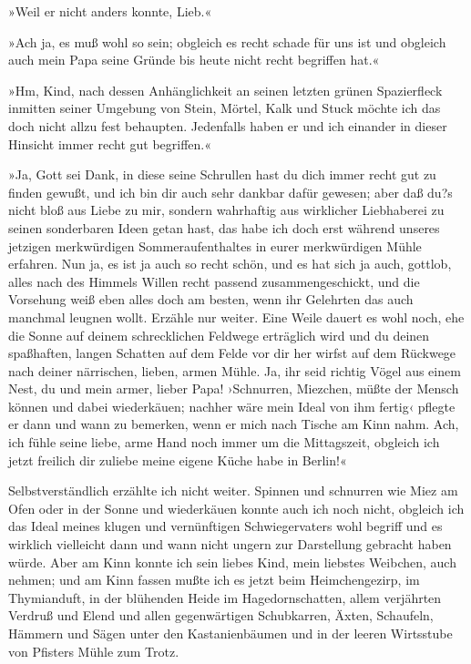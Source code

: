 »Weil er nicht anders konnte, Lieb.«

»Ach ja, es muß wohl so sein; obgleich es recht schade für uns ist
und obgleich auch mein Papa seine Gründe bis heute nicht recht
begriffen hat.«

»Hm, Kind, nach dessen Anhänglichkeit an seinen letzten grünen
Spazierfleck inmitten seiner Umgebung von Stein, Mörtel, Kalk und
Stuck möchte ich das doch nicht allzu fest behaupten. Jedenfalls
haben er und ich einander in dieser Hinsicht immer recht gut
begriffen.«

»Ja, Gott sei Dank, in diese seine Schrullen hast du dich immer
recht gut zu finden gewußt, und ich bin dir auch sehr dankbar dafür
gewesen; aber daß du?s nicht bloß aus Liebe zu mir, sondern
wahrhaftig aus wirklicher Liebhaberei zu seinen sonderbaren Ideen
getan hast, das habe ich doch erst während unseres jetzigen
merkwürdigen Sommeraufenthaltes in eurer merkwürdigen Mühle
erfahren. Nun ja, es ist ja auch so recht schön, und es hat sich ja
auch, gottlob, alles nach des Himmels Willen recht passend
zusammengeschickt, und die Vorsehung weiß eben alles doch am
besten, wenn ihr Gelehrten das auch manchmal leugnen wollt. Erzähle
nur weiter. Eine Weile dauert es wohl noch, ehe die Sonne auf
deinem schrecklichen Feldwege erträglich wird und du deinen
spaßhaften, langen Schatten auf dem Felde vor dir her wirfst auf
dem Rückwege nach deiner närrischen, lieben, armen Mühle. Ja, ihr
seid richtig Vögel aus einem Nest, du und mein armer, lieber Papa!
›Schnurren, Miezchen, müßte der Mensch können und dabei
wiederkäuen; nachher wäre mein Ideal von ihm fertig‹ pflegte er
dann und wann zu bemerken, wenn er mich nach Tische am Kinn nahm.
Ach, ich fühle seine liebe, arme Hand noch immer um die
Mittagszeit, obgleich ich jetzt freilich dir zuliebe meine eigene
Küche habe in Berlin!«

Selbstverständlich erzählte ich nicht weiter. Spinnen und schnurren
wie Miez am Ofen oder in der Sonne und wiederkäuen konnte auch ich
noch nicht, obgleich ich das Ideal meines klugen und vernünftigen
Schwiegervaters wohl begriff und es wirklich vielleicht dann und
wann nicht ungern zur Darstellung gebracht haben würde. Aber am
Kinn konnte ich sein liebes Kind, mein liebstes Weibchen, auch
nehmen; und am Kinn fassen mußte ich es jetzt beim Heimchengezirp,
im Thymianduft, in der blühenden Heide im Hagedornschatten, allem
verjährten Verdruß und Elend und allen gegenwärtigen Schubkarren,
Äxten, Schaufeln, Hämmern und Sägen unter den Kastanienbäumen und
in der leeren Wirtsstube von Pfisters Mühle zum Trotz.

